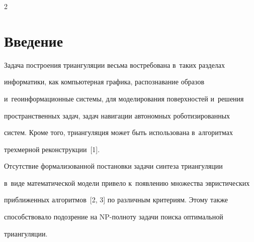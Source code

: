

  















\thispagestyle{headings}





\begin{multicols}{2}





\label{st\stat}





\section{Введение}





  Задача построения триангуляции весьма востребована в~таких разделах 


информатики, как компьютерная графика, рас\-по\-зна\-ва\-ние образов 


и~геоинформационные сис\-те\-мы, для моделирования поверхно\-стей и~решения 


про\-стран\-ст\-вен\-ных задач, задач навигации автономных роботизированных 


сис\-тем. Кроме того, триангуляция может быть использована в~алгоритмах 


трехмерной реконструкции~[1].


  


  Отсутствие формализованной постановки задачи синтеза триангуляции 


в~виде математической модели привело к~по\-яв\-ле\-нию множества эвристических 


при\-бли\-жен\-ных алгоритмов~[2, 3] по различным критериям. Этому также 


способствовало подозрение на NP-пол\-но\-ту задачи поиска оптимальной 


триангуляции.



\end{multicols}

